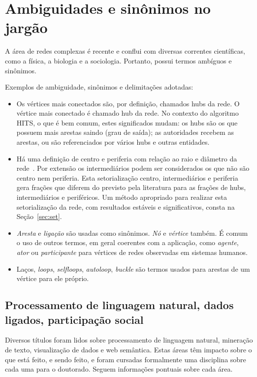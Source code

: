 \documentclass[a4paper,openright,12pt]{report} %
\begin{document}
\section{Ambiguidades e sinônimos no jargão}\label{sec:jar}
A área de redes complexas é recente e conflui com diversas 
correntes científicas, como a física, a biologia e a sociologia.
Portanto, possui termos ambíguos e sinônimos.

Exemplos de ambiguidade, sinônimos e delimitações adotadas:
\begin{itemize}
    \item Os vértices mais conectados são, por definição, chamados hubs da rede. O vértice mais conectado é chamado hub da rede. No contexto do algoritmo HITS, o que é bem comum, estes significados mudam: os hubs são os que possuem mais arestas saindo (grau de saída); as autoridades recebem as arestas, ou são referenciados por vários hubs e outras entidades.
    \item Há uma definição de centro e periferia com relação ao raio e diâmetro da rede~\cite{newman,networkX}.
        Por extensão os intermediários podem ser considerados os que não são centro nem periferia.
        Esta setorialização centro, intermediários e periferia gera frações que diferem do previsto pela literatura para as frações de hubs, intermediários e periféricos.
        Um método apropriado para realizar esta setorialização da rede, com resultados estáveis e significativos, consta na Seção~\ref{sec:set}.
    \item \emph{Aresta} e \emph{ligação} são usadas como sinônimos. \emph{Nó} e \emph{vértice} também. É comum o uso de outros termos, em geral coerentes com a aplicação, como \emph{agente}, \emph{ator} ou \emph{participante} para vértices de redes observadas em sistemas humanos.
    \item Laços, \emph{loops}, \emph{selfloops}, \emph{autoloop}, \emph{buckle} são termos usados para arestas de um vértice para ele próprio.
\end{itemize}

\subsection{Processamento de linguagem natural, dados ligados, participação social}\label{sec:misc}
Diversos títulos foram lidos sobre processamento de linguagem natural, mineração de texto,
visualização de dados e web semântica. Estas áreas têm impacto sobre o que está feito, e sendo feito,
e foram cursadas formalmente uma disciplina sobre cada uma para o doutorado.
Seguem informações pontuais sobre cada área.
\end{document}
